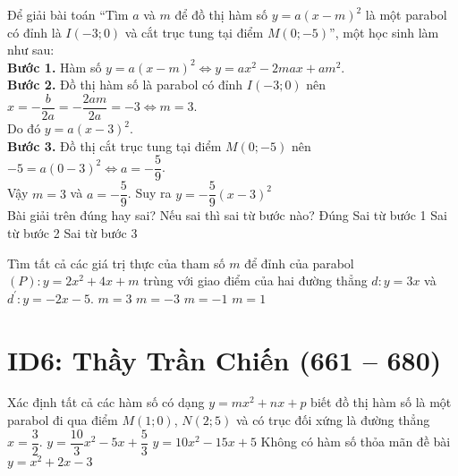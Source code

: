 \begin{ex}%
	Để giải bài toán ``Tìm $a$ và $m$ để đồ thị hàm số $y=a(x-m)^2$ là một parabol có đỉnh là $I(-3;0)$ và cắt trục tung tại điểm $M(0;-5)$'', một học sinh làm như sau:\\
	\textbf{Bước 1.} Hàm số $y=a(x-m)^2\Leftrightarrow y=ax^2-2max+am^2$.\\
	\textbf{Bước 2.} Đồ thị hàm số là parabol có đỉnh $I(-3;0)$ nên $x=-\dfrac{b}{2a}=-\dfrac{2am}{2a}=-3\Leftrightarrow m=3$.\\Do đó $y=a(x-3)^2$.\\
	\textbf{Bước 3.} Đồ thị cắt trục tung tại điểm $M(0;-5)$ nên $-5=a(0-3)^2\Leftrightarrow a=-\dfrac{5}{9}$.\\
	Vậy $m=3$ và $a=-\dfrac{5}{9}$. Suy ra $y=-\dfrac{5}{9}(x-3)^2$\\
	Bài giải trên đúng hay sai? Nếu sai thì sai từ bước nào?
	\choice
	{Đúng}
	{Sai từ bước 1}
	{\True Sai từ bước 2}
	{Sai từ bước 3}
\end{ex}
\begin{ex}%
	Tìm tất cả các giá trị thực của tham số $m$ để đỉnh của parabol $(P): y=2x^2+4x+m$ trùng với giao điểm của hai đường thẳng $d: y=3x$ và $d^\prime: y=-2x-5$.
	\choice
	{$m=3$}
	{$m=-3$}
	{\True $m=-1$}
	{$m=1$}
\end{ex}



\section*{ID6: Thầy Trần Chiến (661 -- 680)}
\begin{ex}%
	Xác định tất cả các hàm số có dạng $y=mx^2+nx+p$ biết đồ thị hàm số là một parabol đi qua điểm $M(1; 0)$, $N(2; 5)$ và có trục đối xứng là đường thẳng $x=\dfrac{3}{2}$.
	\choice
	{$y=\dfrac{10}{3}x^2-5x+\dfrac{5}{3}$}
	{$y=10x^2-15x+5$}
	{\True Không có hàm số thỏa mãn đề bài}
	{$y=x^2+2x-3$}
\end{ex}

